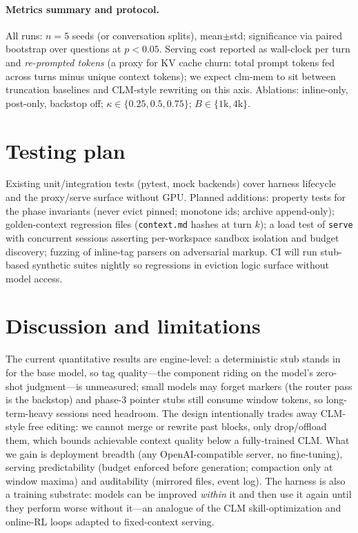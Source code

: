 \documentclass[10pt]{article}
\begin{document}
\paragraph{Metrics summary and protocol.}
All runs: $n=5$ seeds (or conversation splits), mean$\pm$std; significance via paired bootstrap over questions at $p<0.05$. Serving cost reported as wall-clock per turn and \emph{re-prompted tokens} (a proxy for KV cache churn: total prompt tokens fed across turns minus unique context tokens); we expect clm-mem to sit between truncation baselines and CLM-style rewriting on this axis. Ablations: inline-only, post-only, backstop off; $\kappa\in\{0.25,0.5,0.75\}$; $B\in\{1\text{k},4\text{k}\}$.

\section{Testing plan}
Existing unit/integration tests (pytest, mock backends) cover harness lifecycle and the proxy/serve surface without GPU. Planned additions: property tests for the phase invariants (never evict pinned; monotone ids; archive append-only); golden-context regression files (\texttt{context.md} hashes at turn $k$); a load test of \texttt{serve} with concurrent sessions asserting per-workspace sandbox isolation and budget discovery; fuzzing of inline-tag parsers on adversarial markup. CI will run stub-based synthetic suites nightly so regressions in eviction logic surface without model access.

\section{Discussion and limitations}
The current quantitative results are engine-level: a deterministic stub stands in for the base model, so tag quality---the component riding on the model's zero-shot judgment---is unmeasured; small models may forget markers (the router pass is the backstop) and phase-3 pointer stubs still consume window tokens, so long-term-heavy sessions need headroom. The design intentionally trades away CLM-style free editing: we cannot merge or rewrite past blocks, only drop/offload them, which bounds achievable context quality below a fully-trained CLM. What we gain is deployment breadth (any OpenAI-compatible server, no fine-tuning), serving predictability (budget enforced before generation; compaction only at window maxima) and auditability (mirrored files, event log). The harness is also a training substrate: models can be improved \emph{within} it and then use it again until they perform worse without it---an analogue of the CLM skill-optimization and online-RL loops adapted to fixed-context serving.
\end{document}
